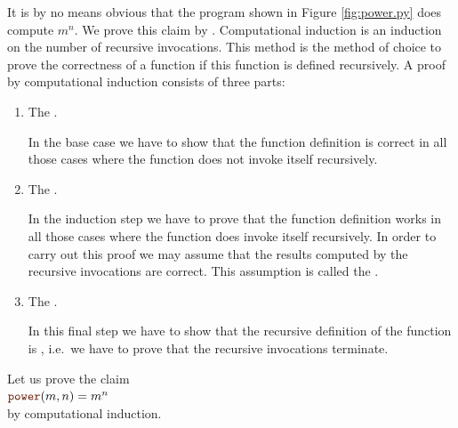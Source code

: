 It is by no means obvious that the program shown in Figure \ref{fig:power.py} does compute
$m^n$.  We prove this claim by  .
Computational induction is an induction on the number of recursive invocations.
This method is the method of choice to prove the correctness of a function if this function is defined recursively.
A proof by computational induction consists of three parts:

\begin{enumerate}
\item The .

      In the base case we have to show that the function definition is correct in all those cases where the function
      does not invoke itself recursively.
\item The .

      In the induction step we have to prove that the function definition works in all those cases where
      the function does invoke itself recursively.  In order to carry out this proof we may
      assume that the results computed by the recursive invocations are correct.
      This assumption is called the .
\item The .

      In this final step we have to show that the recursive definition of the function is ,
      i.e.~we have to prove that the recursive invocations terminate.
\end{enumerate}
Let us prove the claim 
\\[0.2cm]
\hspace*{1.3cm}
 $\mytt{power}(m,n) = m^n$
\\[0.2cm] 
by computational induction.
